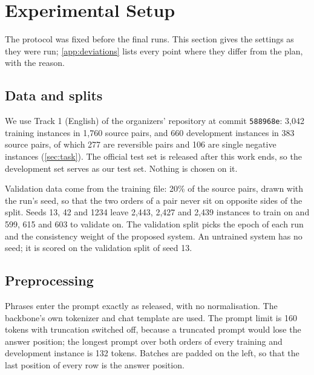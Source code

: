 \section{Experimental Setup}
\label{sec:setup}

The protocol was fixed before the final runs. This section gives the settings as they were run; \cref{app:deviations} lists every point where they differ from the plan, with the reason.

\subsection{Data and splits}
\label{sec:setup-data}

We use Track 1 (English) of the organizers' repository at commit \texttt{588968e}: 3,042 training instances in 1,760 source pairs, and 660 development instances in 383 source pairs, of which 277 are reversible pairs and 106 are single negative instances (\cref{sec:task}). %
The official test set is released after this work ends, so the development set serves as our test set. Nothing is chosen on it.

Validation data come from the training file: 20\% of the source pairs, drawn with the run's seed, so that the two orders of a pair never sit on opposite sides of the split. Seeds 13, 42 and 1234 leave 2,443, 2,427 and 2,439 instances to train on and 599, 615 and 603 to validate on. %
The validation split picks the epoch of each run and the consistency weight of the proposed system. An untrained system has no seed; it is scored on the validation split of seed 13.

\subsection{Preprocessing}
\label{sec:setup-preprocessing}

Phrases enter the prompt exactly as released, with no normalisation. The backbone's own tokenizer and chat template are used. The prompt limit is 160 tokens with truncation switched off, because a truncated prompt would lose the answer position; the longest prompt over both orders of every training and development instance is 132 tokens. %
Batches are padded on the left, so that the last position of every row is the answer position.

